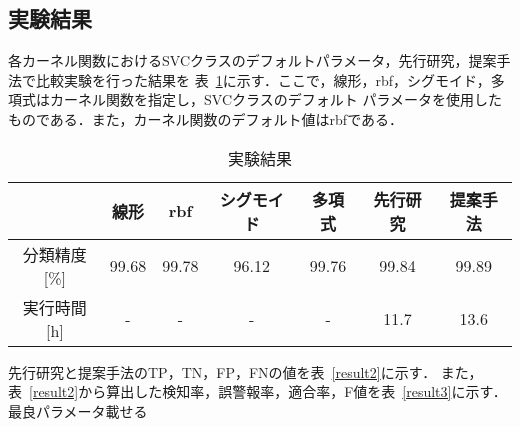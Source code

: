 \subsection{実験結果}
各カーネル関数におけるSVCクラスのデフォルトパラメータ，先行研究，提案手法で比較実験を行った結果を
表~\ref{result1}に示す．ここで，線形，rbf，シグモイド，多項式はカーネル関数を指定し，SVCクラスのデフォルト
パラメータを使用したものである．また，カーネル関数のデフォルト値はrbfである．
\begin{table}[h]
    \centering
    \caption{実験結果}  %
    \begin{tabular}{|c|c|c|c|c|c|c|}  %
        \hline  %
        ~ & 線形 &rbf &シグモイド&多項式&先行研究 & 提案手法\\  %
        \hline  %
        分類精度[\%]& 99.68&99.78&96.12&99.76&99.84& 99.89\\  %
        \hline  %
        実行時間[h] & - & -&-&-&11.7& 13.6\\  %
        \hline  %
    \end{tabular}
    \label{result1}  %
  \end{table}
  先行研究と提案手法のTP，TN，FP，FNの値を表~\ref{result2}に示す．
また，表~\ref{result2}から算出した検知率，誤警報率，適合率，F値を表~\ref{result3}に示す．
最良パラメータ載せる
